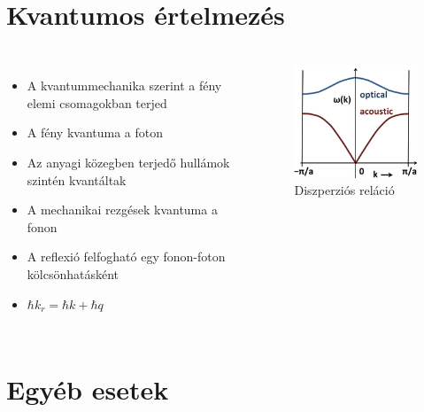\documentclass[aspectratio=169]{beamer}
\begin{document}
\section{Kvantumos értelmezés}
\begin{frame}
\frametitle{\secname}
\begin{columns}
\begin{itemize}
\item A kvantummechanika szerint a fény elemi csomagokban terjed
\item A fény kvantuma a foton
\item Az anyagi közegben terjedő hullámok szintén kvantáltak
\item A mechanikai rezgések kvantuma a fonon
\item A reflexió felfogható egy fonon-foton kölcsönhatásként
\item $\hbar k_r = \hbar k + \hbar q$
\end{itemize}
\begin{figure}
\raggedright
\includegraphics[width=.95\textwidth]{diat_phonon.png}
\caption{Diszperziós reláció}
\end{figure}
\end{columns}
\end{frame}
\section{Egyéb esetek}
\end{document}
